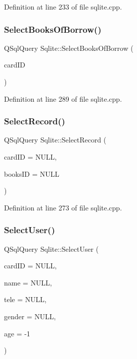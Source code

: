 Definition at line 233 of file sqlite.\+cpp.

\mbox{\label{class_sqlite_ab9e451e38960661c5a493948453b63c7}} 
\subsubsection{\texorpdfstring{SelectBooksOfBorrow()}{SelectBooksOfBorrow()}}
{\footnotesize\ttfamily Q\+Sql\+Query Sqlite\+::\+Select\+Books\+Of\+Borrow (\begin{DoxyParamCaption}\item[{Q\+String}]{card\+ID }\end{DoxyParamCaption})}



Definition at line 289 of file sqlite.\+cpp.

\mbox{\label{class_sqlite_a3c012aa302538385ce05d0b0371a9860}} 
\subsubsection{\texorpdfstring{SelectRecord()}{SelectRecord()}}
{\footnotesize\ttfamily Q\+Sql\+Query Sqlite\+::\+Select\+Record (\begin{DoxyParamCaption}\item[{Q\+String}]{card\+ID = {\ttfamily NULL},  }\item[{Q\+String}]{books\+ID = {\ttfamily NULL} }\end{DoxyParamCaption})}



Definition at line 273 of file sqlite.\+cpp.

\mbox{\label{class_sqlite_aa540de99093cdea8160088a2c69872ee}} 
\subsubsection{\texorpdfstring{SelectUser()}{SelectUser()}}
{\footnotesize\ttfamily Q\+Sql\+Query Sqlite\+::\+Select\+User (\begin{DoxyParamCaption}\item[{Q\+String}]{card\+ID = {\ttfamily NULL},  }\item[{Q\+String}]{name = {\ttfamily NULL},  }\item[{Q\+String}]{tele = {\ttfamily NULL},  }\item[{Q\+String}]{gender = {\ttfamily NULL},  }\item[{int}]{age = {\ttfamily -\/1} }\end{DoxyParamCaption})}




